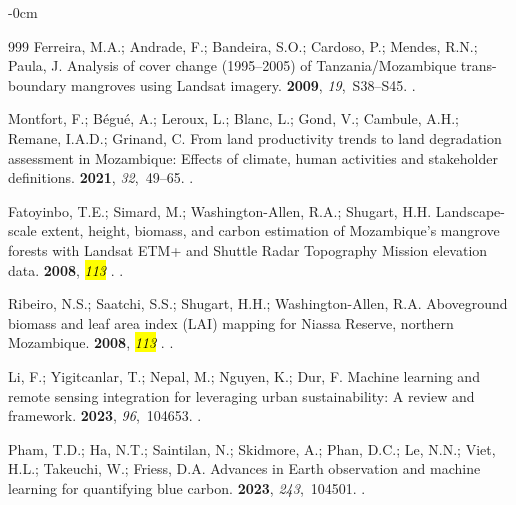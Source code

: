 \documentclass[coasts,article,accept,pdftex,oneauthor]{Definitions/mdpi}
\begin{document}
\begin{adjustwidth}{-\extralength}{0cm}
\begin{thebibliography}{999}
Ferreira, M.A.; Andrade, F.; Bandeira, S.O.; Cardoso, P.; Mendes, R.N.; Paula,
  J.
\newblock Analysis of cover change (1995–2005) of Tanzania/Mozambique
  trans-boundary mangroves using Landsat imagery.
 {\bf
  2009}, {\em 19},~S38--S45.
.

Montfort, F.; Bégué, A.; Leroux, L.; Blanc, L.; Gond, V.; Cambule, A.H.;
  Remane, I.A.D.; Grinand, C.
\newblock From land productivity trends to land degradation assessment in
  Mozambique: Effects of climate, human activities and stakeholder definitions.
 {\bf 2021}, {\em 32},~49--65.
.

Fatoyinbo, T.E.; Simard, M.; Washington-Allen, R.A.; Shugart, H.H.
\newblock Landscape-scale extent, height, biomass, and carbon estimation of
  Mozambique's mangrove forests with Landsat ETM+ and Shuttle Radar Topography
  Mission elevation data.
 {\bf 2008},
  {\em \hl{113}%
}.
.

Ribeiro, N.S.; Saatchi, S.S.; Shugart, H.H.; Washington-Allen, R.A.
\newblock Aboveground biomass and leaf area index (LAI) mapping for Niassa
  Reserve, northern Mozambique.
 {\bf 2008},
 {\em \hl{113}%
}.
.

Li, F.; Yigitcanlar, T.; Nepal, M.; Nguyen, K.; Dur, F.
\newblock Machine learning and remote sensing integration for leveraging urban
  sustainability: A review and framework.
 {\bf 2023}, {\em 96},~104653.
.

Pham, T.D.; Ha, N.T.; Saintilan, N.; Skidmore, A.; Phan, D.C.; Le, N.N.; Viet,
  H.L.; Takeuchi, W.; Friess, D.A.
\newblock Advances in Earth observation and machine learning for quantifying
  blue carbon.
 {\bf 2023}, {\em 243},~104501.
.


\end{thebibliography}
\end{adjustwidth}
\end{document}
